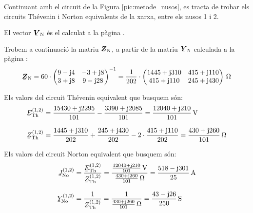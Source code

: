 \begin{exemple}
Continuant amb el circuit de la Figura \vref{pic:metode_nusos}, es
tracta de trobar els circuits Th\'{e}venin i Norton equivalents de la
xarxa, entre els nusos 1 i 2.

El vector $\mcmplx{V}\ped{N}$ \'{e}s el calculat a la p\`{a}gina \pageref{eq:vn_exemp}.

Trobem a continuaci\'{o} la matriu $\mcmplx{Z}\ped{N}$, a partir de la matriu $\mcmplx{Y}\ped{N}$
calculada a la p\`{a}gina \pageref{eq:yn}:
\[
   \mcmplx{Z}\ped{N} =
   60 \cdot \begin{pmatrix}
            9 - \ju 4 & -3 + \ju 8 \\
            3 + \ju 8 & 9 - \ju 28
      \end{pmatrix} ^{-1} =
   \frac{1}{202} \cdot \begin{pmatrix}
         1445 + \ju 310 & 415 + \ju 110 \\
         415 + \ju 110 & 245 + \ju 430
   \end{pmatrix}\unit{\ohm}
\]

Els valors del circuit Th\'{e}venin equivalent que busquem s\'{o}n:
\begin{align*}
   \cmplx{E}\ped{Th}^{(1,2)} &= \frac{15430 + \ju 2295}{101} - \frac{3390 + \ju 2085}{101} =
   \frac{12040 + \ju 210}{101}\unit{V} \\[2ex]
   \cmplx{Z}\ped{Th}^{(1,2)} &= \frac{1445 + \ju 310}{202} + \frac{245 + \ju 430}{202} -
   2\cdot\frac{415 + \ju 110}{202} = \frac{430 + \ju 260}{101}\unit{\ohm}
\end{align*}

Els valors del circuit Norton equivalent que busquem s\'{o}n:
\begin{align*}
   \cmplx{J}\ped{No}^{(1,2)} &= \frac{\cmplx{E}\ped{Th}^{(1,2)}}{\cmplx{Z}\ped{Th}^{(1,2)}} =
   \frac{\frac{12040 + \ju 210}{101}\unit{V}}{\frac{430 + \ju 260}{101}\unit{\ohm}} =
   \frac{518 - \ju 301}{25}\unit{A} \\[2ex]
   \cmplx{Y}\ped{No}^{(1,2)} &= \frac{1}{\cmplx{Z}\ped{Th}^{(1,2)}} =
   \frac{1}{\frac{430 + \ju 260}{101}\unit{\ohm}} = \frac{43 - \ju 26}{250}\unit{S}
\end{align*}

\end{exemple}
